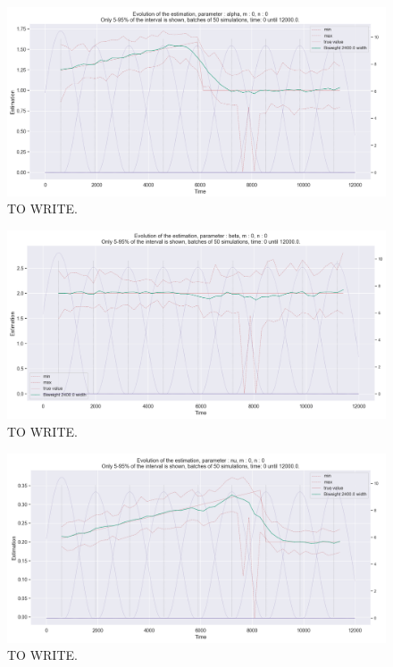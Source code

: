 \begin{figure}
\centering
\includegraphics[width = 0.90 \textwidth]{../imag/chap3/3/Figure_2.png}
\caption{TO WRITE.}
\label{fig:first_estimate_3_alpha}
\end{figure}

\begin{figure}
\centering
\includegraphics[width = 0.90 \textwidth]{../imag/chap3/3/Figure_3.png}
\caption{TO WRITE.}
\label{fig:first_estimate_3_beta}
\end{figure}

\begin{figure}
\centering
\includegraphics[width = 0.90 \textwidth]{../imag/chap3/3/Figure_4.png}
\caption{TO WRITE.}
\label{fig:first_estimate_3_nu}
\end{figure}

















